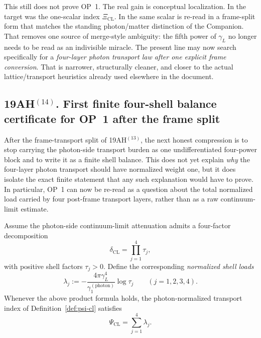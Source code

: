 \begin{remark}
This still does not prove OP~1. The real gain is conceptual localization. In the target was the one-scalar index \(\Xi_{\mathrm{CL}}\). In the same scalar is re-read in a frame-split form that matches the standing photon/matter distinction of the Companion. That removes one source of merge-style ambiguity: the fifth power of \(\gamma_L\) no longer needs to be read as an indivisible miracle. The present line may now search specifically for a \emph{four-layer photon transport law after one explicit frame conversion}. That is narrower, structurally cleaner, and closer to the actual lattice/transport heuristics already used elsewhere in the document.
\end{remark}

\subsection*{19AH$^{(14)}$. First finite four-shell balance certificate for OP~1 after the frame split}
After the frame-transport split of 19AH$^{(13)}$, the next honest compression is to stop carrying the photon-side transport burden as one undifferentiated four-power block and to write it as a finite shell balance. This does not yet explain \emph{why} the four-layer photon transport should have normalized weight one, but it does isolate the exact finite statement that any such explanation would have to prove. In particular, OP~1 can now be re-read as a question about the total normalized load carried by four post-frame transport layers, rather than as a raw continuum-limit estimate.

\begin{definition}
\label{def:op1-four-shell-loads}
Assume the photon-side continuum-limit attenuation admits a four-factor decomposition
\[
 \delta_{\mathrm{CL}} = \prod_{j=1}^4 \tau_j,
\]
with positive shell factors \(\tau_j>0\). Define the corresponding \emph{normalized shell loads}
\[
 \lambda_j := -\frac{4\pi\gamma_L^4}{\gamma_1^{(\mathrm{photon})}}\log \tau_j
 \qquad (j=1,2,3,4).
\]
Whenever the above product formula holds, the photon-normalized transport index of Definition~\ref{def:psi-cl} satisfies
\[
 \Psi_{\mathrm{CL}} = \sum_{j=1}^4 \lambda_j.
\]
\end{definition}

